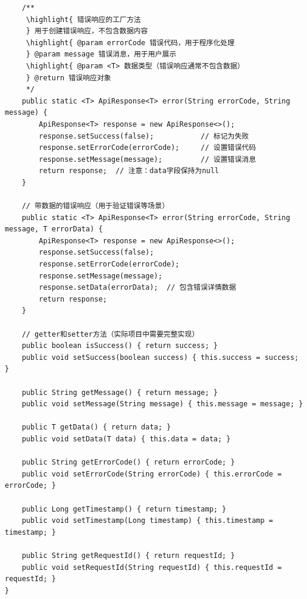 \begin{lstlisting}
    /**
     \highlight{ 错误响应的工厂方法
     } 用于创建错误响应，不包含数据内容
     \highlight{ @param errorCode 错误代码，用于程序化处理
     } @param message 错误消息，用于用户展示
     \highlight{ @param <T> 数据类型（错误响应通常不包含数据）
     } @return 错误响应对象
     */
    public static <T> ApiResponse<T> error(String errorCode, String message) {
        ApiResponse<T> response = new ApiResponse<>();
        response.setSuccess(false);           // 标记为失败
        response.setErrorCode(errorCode);     // 设置错误代码
        response.setMessage(message);         // 设置错误消息
        return response;  // 注意：data字段保持为null
    }
    
    // 带数据的错误响应（用于验证错误等场景）
    public static <T> ApiResponse<T> error(String errorCode, String message, T errorData) {
        ApiResponse<T> response = new ApiResponse<>();
        response.setSuccess(false);
        response.setErrorCode(errorCode);
        response.setMessage(message);
        response.setData(errorData);  // 包含错误详情数据
        return response;
    }
    
    // getter和setter方法（实际项目中需要完整实现）
    public boolean isSuccess() { return success; }
    public void setSuccess(boolean success) { this.success = success; }
    
    public String getMessage() { return message; }
    public void setMessage(String message) { this.message = message; }
    
    public T getData() { return data; }
    public void setData(T data) { this.data = data; }
    
    public String getErrorCode() { return errorCode; }
    public void setErrorCode(String errorCode) { this.errorCode = errorCode; }
    
    public Long getTimestamp() { return timestamp; }
    public void setTimestamp(Long timestamp) { this.timestamp = timestamp; }
    
    public String getRequestId() { return requestId; }
    public void setRequestId(String requestId) { this.requestId = requestId; }
}


\end{lstlisting}

